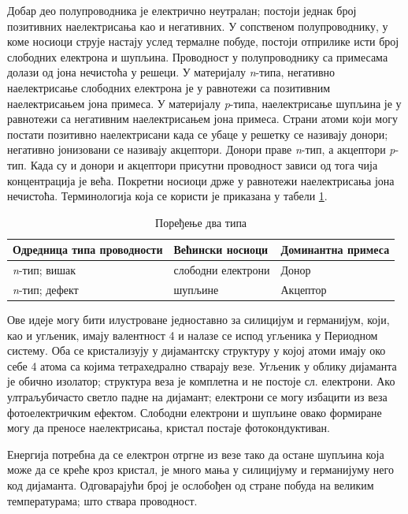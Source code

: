 \documentclass{article}
\begin{document}
Добар део полупроводника је електрично неутралан; постоји једнак број позитивних наелектрисања као и негативних. У сопственом полупроводнику, у коме носиоци струје настају услед термалне побуде, постоји отприлике исти број слободних електрона и шупљина. Проводност у полупроводнику са примесама долази од јона нечистоћа у решеци.  У материјалу \textit{n}-типа, негативно наелектрисање слободних електрона је у равнотежи са позитивним наелектрисањем јона примеса. У материјалу \textit{p}-типа, наелектрисање шупљина је у равнотежи са негативним наелектрисањем јона примеса. Страни атоми који могу постати позитивно наелектрисани када се убаце у решетку се називају донори; негативно јонизовани се називају акцептори. Донори праве \textit{n}-тип, а акцептори \textit{p}-тип. Када су и донори и акцептори присутни проводност зависи од тога чија концентрација је већа. Покретни носиоци држе у равнотежи наелектрисања јона нечистоћа. Терминологија која се користи је приказана у табели \ref{table:terminology-comparison}.

\begin{table}[ht]
	\centering
	\begin{tabular}{l|l|l}
		Одредница типа проводности & Већински носиоци & Доминантна примеса\\
		\hline
		\hline
		\textit{n}-тип; вишак & слободни електрони & Донор\\ 
		\hline
		\textit{n}-тип; дефект & шупљине & Акцептор \\ 
	\end{tabular}
	\caption{Поређење два типа} 
    \label{table:terminology-comparison}
\end{table}


Ове идеје могу бити илустроване једноставно за силицијум и германијум, који, као и угљеник, имају валентност 4 и налазе се испод угљеника у Периодном систему. Оба се кристализују у дијамантску структуру у којој атоми имају око себе 4 атома са којима тетрахедрално стварају везе. Угљеник у облику дијаманта је обично изолатор; структура веза је комплетна и не постоје сл. електрони. Ако ултраљубичасто светло падне на дијамант; електрони се могу избацити из веза фотоелектричким ефектом. Слободни електрони и шупљине овако формиране могу да преносе наелектрисања, кристал постаје фотокондуктиван. 

Енергија потребна да се електрон отргне из везе тако да остане шупљина која може да се креће кроз кристал, је много мања у силицијуму и германијуму него код дијаманта. Одговарајући број је ослобођен од стране побуда на великим температурама; што ствара проводност.
\end{document}
